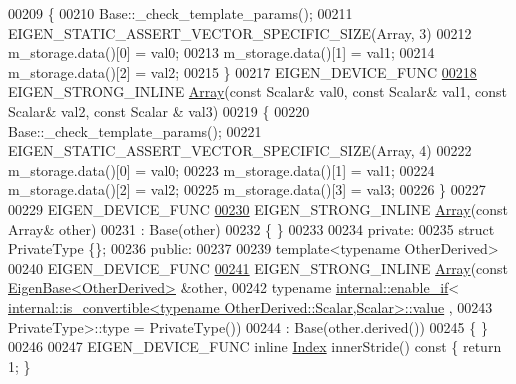 \begin{DoxyCode}
00209     \{
00210       Base::\_check\_template\_params();
00211       EIGEN\_STATIC\_ASSERT\_VECTOR\_SPECIFIC\_SIZE(Array, 3)
00212       m\_storage.data()[0] = val0;
00213       m\_storage.data()[1] = val1;
00214       m\_storage.data()[2] = val2;
00215     \}
00217     EIGEN\_DEVICE\_FUNC
\hyperlink{group___core___module_ad4d80ab64904b4b4e8e59d8a96f659b4}{00218}     EIGEN\_STRONG\_INLINE \hyperlink{group___core___module_ad4d80ab64904b4b4e8e59d8a96f659b4}{Array}(\textcolor{keyword}{const} Scalar& val0, \textcolor{keyword}{const} Scalar& val1, \textcolor{keyword}{const} Scalar& val2, \textcolor{keyword}{const} Scalar
      & val3)
00219     \{
00220       Base::\_check\_template\_params();
00221       EIGEN\_STATIC\_ASSERT\_VECTOR\_SPECIFIC\_SIZE(Array, 4)
00222       m\_storage.data()[0] = val0;
00223       m\_storage.data()[1] = val1;
00224       m\_storage.data()[2] = val2;
00225       m\_storage.data()[3] = val3;
00226     \}
00227 
00229     EIGEN\_DEVICE\_FUNC
\hyperlink{group___core___module_a085268ca25404d706e7b8f4d33f15513}{00230}     EIGEN\_STRONG\_INLINE \hyperlink{group___core___module_a085268ca25404d706e7b8f4d33f15513}{Array}(\textcolor{keyword}{const} Array& other)
00231             : Base(other)
00232     \{ \}
00233 
00234   \textcolor{keyword}{private}:
00235     \textcolor{keyword}{struct }PrivateType \{\};
00236   \textcolor{keyword}{public}:
00237 
00239     \textcolor{keyword}{template}<\textcolor{keyword}{typename} OtherDerived>
00240     EIGEN\_DEVICE\_FUNC
\hyperlink{group___core___module_a7a08ebcc8bef6c9df21becd525792240}{00241}     EIGEN\_STRONG\_INLINE \hyperlink{group___core___module_a7a08ebcc8bef6c9df21becd525792240}{Array}(\textcolor{keyword}{const} \hyperlink{group___core___module_struct_eigen_1_1_eigen_base}{EigenBase<OtherDerived>} &other,
00242                               \textcolor{keyword}{typename} \hyperlink{struct_eigen_1_1internal_1_1enable__if}{internal::enable\_if}<
      \hyperlink{struct_eigen_1_1internal_1_1is__convertible}{internal::is\_convertible<typename OtherDerived::Scalar,Scalar>::value}
      ,
00243                                                            PrivateType>::type = PrivateType())
00244       : Base(other.derived())
00245     \{ \}
00246 
00247     EIGEN\_DEVICE\_FUNC \textcolor{keyword}{inline} \hyperlink{namespace_eigen_a62e77e0933482dafde8fe197d9a2cfde}{Index} innerStride()\textcolor{keyword}{ const }\{ \textcolor{keywordflow}{return} 1; \}

\end{DoxyCode}
